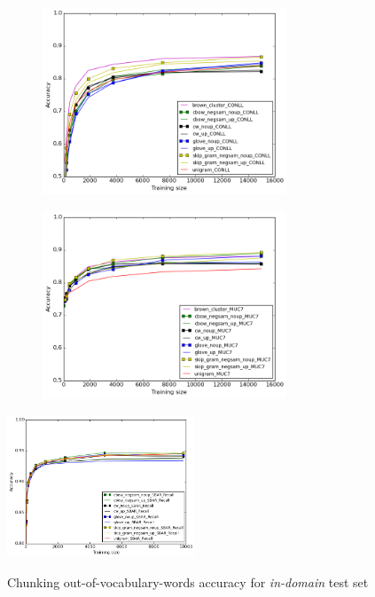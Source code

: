 \begin{figure}[h]
\caption{NER out-of-vocabulary-words accuracy for \textit{in-domain} and \textit{out-of-domain} test sets}
\centering
\begin{subfigure}{.5\textwidth}
	\centering
    	\includegraphics[width=0.8\textwidth]{plots/NER-OOV-IN.png}
	\label{fig:inner}
\end{subfigure}
\begin{subfigure}{.5\textwidth}
	\centering
    	\includegraphics[width=0.8\textwidth]{plots/NER-OOV-OUT.png}
	\label{fig:outner}
\end{subfigure}  	
\end{figure}


\begin{figure}[h]
\caption{Chunking out-of-vocabulary-words accuracy for \textit{in-domain} test set}
\centering
    	\includegraphics[width=0.5\textwidth]{plots/Chunking-OOV.png}    
\label{fig:outchunking}
\end{figure}

